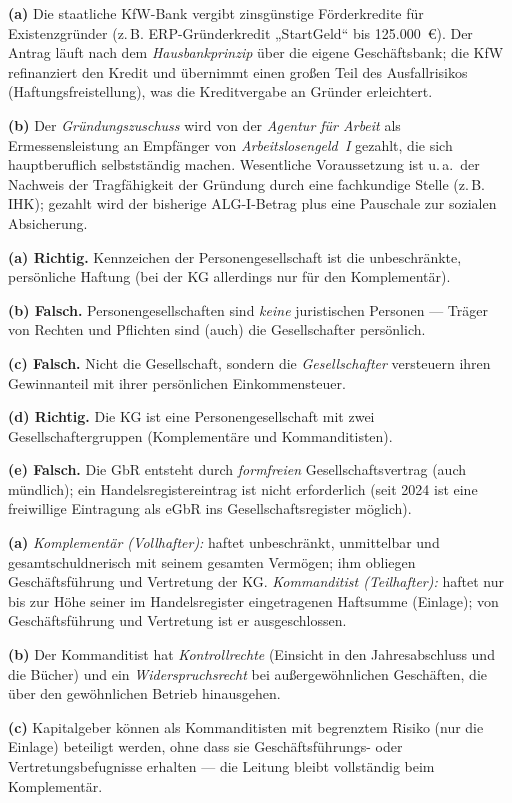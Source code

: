 \documentclass[11pt, a4paper]{article}
\begin{document}
\begin{loesung}[title={Lösung Aufgabe~4 --- Fördermöglichkeiten}]
\textbf{(a)} Die staatliche KfW-Bank vergibt zinsgünstige Förderkredite für
Existenzgründer (z.\,B. ERP-Gründerkredit „StartGeld`` bis 125.000~€). Der Antrag läuft
nach dem \emph{Hausbankprinzip} über die eigene Geschäftsbank; die KfW refinanziert den
Kredit und übernimmt einen großen Teil des Ausfallrisikos (Haftungsfreistellung), was die
Kreditvergabe an Gründer erleichtert.

\textbf{(b)} Der \emph{Gründungszuschuss} wird von der \emph{Agentur für Arbeit} als
Ermessensleistung an Empfänger von \emph{Arbeitslosengeld~I} gezahlt, die sich
hauptberuflich selbstständig machen. Wesentliche Voraussetzung ist u.\,a.\ der Nachweis
der Tragfähigkeit der Gründung durch eine fachkundige Stelle (z.\,B. IHK); gezahlt wird
der bisherige ALG-I-Betrag plus eine Pauschale zur sozialen Absicherung.
\end{loesung}

\begin{loesung}[title={Lösung Aufgabe~5 --- Personengesellschaften}]
\textbf{(a) Richtig.} Kennzeichen der Personengesellschaft ist die unbeschränkte,
persönliche Haftung (bei der KG allerdings nur für den Komplementär).

\textbf{(b) Falsch.} Personengesellschaften sind \emph{keine} juristischen Personen ---
Träger von Rechten und Pflichten sind (auch) die Gesellschafter persönlich.

\textbf{(c) Falsch.} Nicht die Gesellschaft, sondern die \emph{Gesellschafter} versteuern
ihren Gewinnanteil mit ihrer persönlichen Einkommensteuer.

\textbf{(d) Richtig.} Die KG ist eine Personengesellschaft mit zwei Gesellschaftergruppen
(Komplementäre und Kommanditisten).

\textbf{(e) Falsch.} Die GbR entsteht durch \emph{formfreien} Gesellschaftsvertrag
(auch mündlich); ein Handelsregistereintrag ist nicht erforderlich (seit 2024 ist eine
freiwillige Eintragung als eGbR ins Gesellschaftsregister möglich).
\end{loesung}

\begin{loesung}[title={Lösung Aufgabe~6 --- Kommanditgesellschaft}]
\textbf{(a)} \emph{Komplementär (Vollhafter):} haftet unbeschränkt, unmittelbar und
gesamtschuldnerisch mit seinem gesamten Vermögen; ihm obliegen Geschäftsführung und
Vertretung der KG. \emph{Kommanditist (Teilhafter):} haftet nur bis zur Höhe seiner im
Handelsregister eingetragenen Haftsumme (Einlage); von Geschäftsführung und Vertretung
ist er ausgeschlossen.

\textbf{(b)} Der Kommanditist hat \emph{Kontrollrechte} (Einsicht in den Jahresabschluss
und die Bücher) und ein \emph{Widerspruchsrecht} bei außergewöhnlichen Geschäften, die
über den gewöhnlichen Betrieb hinausgehen.

\textbf{(c)} Kapitalgeber können als Kommanditisten mit begrenztem Risiko (nur die
Einlage) beteiligt werden, ohne dass sie Geschäftsführungs- oder Vertretungsbefugnisse
erhalten --- die Leitung bleibt vollständig beim Komplementär.
\end{loesung}
\end{document}
